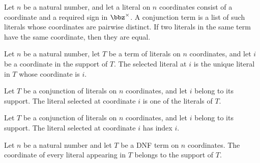 \begin{theorem}
\label{FABL.DNFTerm.eq_of_mem_of_index_eq}
\leanok
{}
Let $n$ be a natural number, and let a literal on $n$ coordinates consist of a
coordinate and a required sign in $\bbz^\times$. A conjunction term is a list of such
literals whose coordinates are pairwise distinct. If two literals in the same term have
the same coordinate, then they are equal.
\end{theorem}

\begin{definition}
\label{FABL.DNFTerm.literalAt}
\leanok
{}
Let $n$ be a natural number, let $T$ be a term of literals on $n$ coordinates, and let
$i$ be a coordinate in the support of $T$. The selected literal at $i$ is the unique
literal in $T$ whose coordinate is $i$.
\end{definition}

\begin{theorem}
\label{FABL.DNFTerm.literalAt_mem}
\leanok
{}
Let $T$ be a conjunction of literals on $n$ coordinates, and let $i$ belong to its
support. The literal selected at coordinate $i$ is one of the literals of $T$.
\end{theorem}

\begin{theorem}
\label{FABL.DNFTerm.literalAt_index}
\leanok
{}
Let $T$ be a conjunction of literals on $n$ coordinates, and let $i$ belong to its
support. The literal selected at coordinate $i$ has index $i$.
\end{theorem}

\begin{theorem}
\label{FABL.DNFTerm.mem_support_of_mem_literals}
\leanok
{}
Let $n$ be a natural number and let $T$ be a DNF term on $n$ coordinates. The coordinate
of every literal appearing in $T$ belongs to the support of $T$.
\end{theorem}

